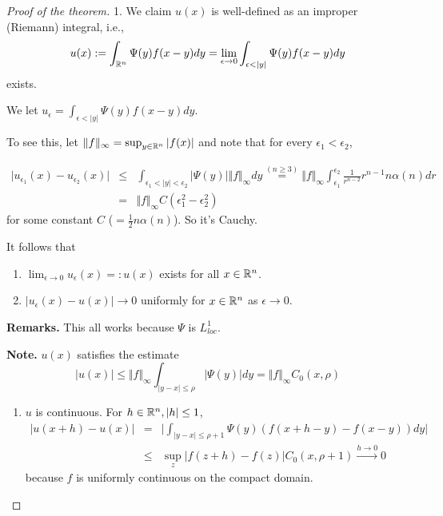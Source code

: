 \documentclass[11pt]{amsart}%
\begin{document}
\begin{proof}[Proof of the theorem] 
1. We claim \(u(x)\) is well-defined as an
improper (Riemann) integral, i.e.,
\[u(x):=\int_{\mathbb{R}^n}\Psi(y)f(x-y)dy =\lim_{\epsilon\to 0}\int_{\epsilon<\vert y\vert}\Psi(y)f(x-y)dy\]
exists.

We let \(u_{\epsilon} = \int_{\epsilon<\vert y\vert}\Psi(y)f(x-y)dy\).

To see this, let \(\Vert f\Vert_\infty =\sup_{y\in\mathbb{R}^n}\vert f(x)\vert\)
and note that for every \(\epsilon_1<\epsilon_2\),

\begin{eqnarray*}
\vert u_{\epsilon_1}(x)-u_{\epsilon_2}(x)\vert &\le& \int_{\epsilon_1<\vert y\vert <\epsilon_2} \vert \Psi(y)\vert \Vert f\Vert_\infty dy\stackrel{(n\ge 3)}{=} \Vert f\Vert_\infty \int_{\epsilon_1}^{\epsilon_2}\frac{1}{r^{n-2}}r^{n-1}n\alpha(n)dr\\ &=& \Vert f\Vert_\infty C(\epsilon_1^2-\epsilon_2^2)
\end{eqnarray*}
for some constant \(C\) (\(=\frac{1}{2} n\alpha(n)\)). So it's
Cauchy.

It follows that

\begin{enumerate}
\def\labelenumi{(\roman{enumi})}

\item
  \(\lim_{\epsilon\to0}u_\epsilon(x)=:u(x)\) exists for all
  \(x\in \mathbb{R}^n\).
\item
  \(\vert u_\epsilon (x)-u(x)\vert \to 0\) uniformly for \(x\in\mathbb{R}^n\) as
  \(\epsilon\to 0\).
\end{enumerate}

\textbf{Remarks.} This all works because \(\Psi\) is \(L_{loc}^1\).

\textbf{Note.} \(u(x)\) satisfies the estimate
\[\vert u(x)\vert \le \Vert f\Vert_\infty \int_{\vert y-x\vert \le \rho} \vert \Psi(y)\vert dy = \Vert f\Vert_\infty C_0(x,\rho)\]

\begin{enumerate}
\def\labelenumi{\arabic{enumi}.}
\setcounter{enumi}{1}

\item
  \(u\) is continuous. For \(h\in \mathbb{R}^n, \vert h\vert \le 1\),
  \begin{eqnarray*}\vert u(x+h)-u(x)\vert &=& \vert \int_{\vert y-x\vert \le \rho+1} \Psi(y)(f(x+h-y)-f(x-y))dy\vert\\ &\le& \sup_z\vert f(z+h)-f(z)\vert C_0(x,\rho+1)\stackrel{h\to0}{\to}0
  \end{eqnarray*}
  because \(f\) is uniformly continuous on the compact domain.
\end{enumerate}


\end{proof}
\end{document}
